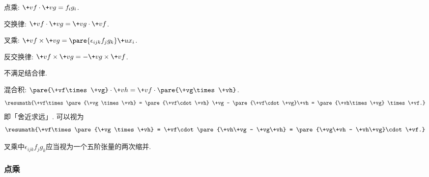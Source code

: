 \documentclass[hidelinks]{ctexart}
\begin{document}
\begin{cenum}
    \item 点乘: $\+vf \cdot \+vg = f_i g_i$.
    \begin{cenum}
        \item 交换律: $\+vf \cdot \+vg = \+vg \cdot \+vf$.
    \end{cenum}
    \item 叉乘: $\+vf\times \+vg = \pare{\epsilon_{ijk}f_jg_k}\+ux_i$.
    \begin{cenum}
        \item 反交换律: $\+vf\times \+vg=-\+vg\times \+vf$.
        \item 不满足结合律.
    \end{cenum}
    \item 混合积: $\pare{\+vf\times \+vg}\cdot\+vh = \+vf\cdot\pare{\+vg\times \+vh}$.
        \[ \resumath{\+vf\times \pare{\+vg \times \+vh} = \pare{\+vf\cdot \+vh} \+vg - \pare{\+vf\cdot \+vg}\+vh = \pare{\+vh\times \+vg} \times \+vf.} \]
        即「舍近求远」. 可以视为
        \[ \resumath{\+vf\times\pare{\+vg \times \+vh} = \+vf\cdot\pare{\+vh\+vg - \+vg\+vh} = \pare{\+vg\+vh - \+vh\+vg}\cdot \+vf.} \]
\end{cenum}
叉乘中$\epsilon_{ijk}f_jg_k$应当视为一个五阶张量的两次缩并.


\subsubsection{点乘} %
\label{ssub:点乘}
\end{document}
